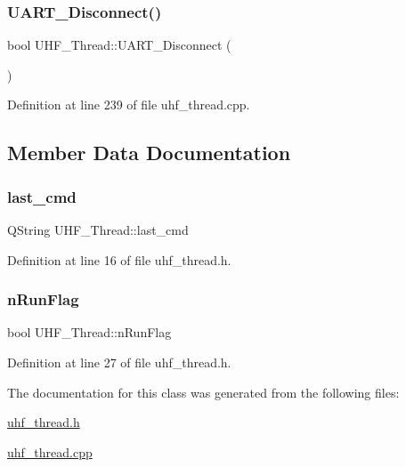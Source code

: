 \mbox{\label{class_u_h_f___thread_a4d29770cacd38ec97148b8642df794b8}} 
\subsubsection{\texorpdfstring{UART\_Disconnect()}{UART\_Disconnect()}}
{\footnotesize\ttfamily bool U\+H\+F\+\_\+\+Thread\+::\+U\+A\+R\+T\+\_\+\+Disconnect (\begin{DoxyParamCaption}{ }\end{DoxyParamCaption})}



Definition at line 239 of file uhf\+\_\+thread.\+cpp.



\subsection{Member Data Documentation}
\mbox{\label{class_u_h_f___thread_a04164c9431f66a3e25ea1206ac1b1adc}} 
\subsubsection{\texorpdfstring{last\_cmd}{last\_cmd}}
{\footnotesize\ttfamily Q\+String U\+H\+F\+\_\+\+Thread\+::last\+\_\+cmd}



Definition at line 16 of file uhf\+\_\+thread.\+h.

\mbox{\label{class_u_h_f___thread_ab40811b93c5e8b31c4f40cc79139e504}} 
\subsubsection{\texorpdfstring{nRunFlag}{nRunFlag}}
{\footnotesize\ttfamily bool U\+H\+F\+\_\+\+Thread\+::n\+Run\+Flag}



Definition at line 27 of file uhf\+\_\+thread.\+h.



The documentation for this class was generated from the following files\+:\begin{DoxyCompactItemize}
\item 
\mbox{\hyperlink{uhf__thread_8h}{uhf\+\_\+thread.\+h}}\item 
\mbox{\hyperlink{uhf__thread_8cpp}{uhf\+\_\+thread.\+cpp}}\end{DoxyCompactItemize}
